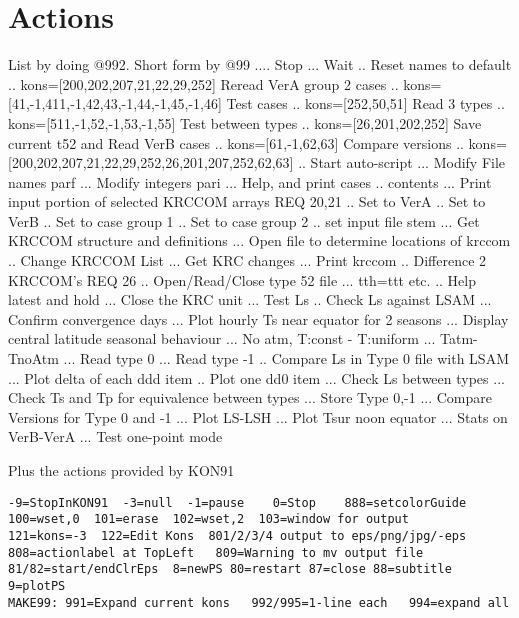 \documentclass{article}  %
\begin{document}
\section{Actions} %
List by doing  @992.  Short form by @99
\qi {}.... Stop
\qi {}...  Wait
\qi {}.. Reset names to default
\qi {}.. kons=[200,202,207,21,22,29,252] Reread VerA group 2 cases
\qi {}.. kons=[41,-1,411,-1,42,43,-1,44,-1,45,-1,46] Test cases
\qi {}.. kons=[252,50,51] Read 3 types 
\qi {}.. kons=[511,-1,52,-1,53,-1,55] Test between types
\qi {}.. kons=[26,201,202,252] Save current t52 and Read VerB cases
\qi {}.. kons=[61,-1,62,63] Compare versions
\qi {}.. kons=[200,202,207,21,22,29,252,26,201,207,252,62,63]
\qi {}.. Start auto-script 
\qi {}... Modify File names parf
\qi {}... Modify integers pari
\qi {}... Help, and print cases
\qi {}.. contents
\qi {}... Print input portion of selected KRCCOM arrays REQ 20,21
\qi {}.. Set to VerA 
\qi {}.. Set to VerB
\qi {}.. Set to case group 1
\qi {}.. Set to case group 2
\qi {}.. set input file stem
\qi {}... Get KRCCOM structure and definitions
\qi {}... Open file to determine locations of krccom
\qi {}.. Change KRCCOM List
\qi {}... Get KRC changes
\qi {}... Print krccom
\qi {}.. Difference 2 KRCCOM's  REQ 26
\qi {}.. Open/Read/Close type 52 file
\qi {}... tth=ttt etc.
\qi {}.. Help latest and hold
\qi {}... Close the KRC unit
\qi {}... Test Ls
\qi {}.. Check Ls against LSAM
\qi {}... Confirm convergence days
\qi {}... Plot hourly Ts near equator for 2 seasons
\qi {}... Display central latitude seasonal behaviour
\qi {}... No atm, T:const - T:uniform
\qi {}... Tatm-TnoAtm
\qi {}... Read type 0
\qi {}... Read type -1
\qi {}.. Compare Ls in Type 0 file with LSAM 
\qi {}... Plot delta  of each ddd item
\qi {}.. Plot one dd0 item
\qi {}... Check Ls between types
\qi {}... Check Ts and Tp for equivalence between types
\qi {}... Store Type 0,-1
\qi {}... Compare Versions for Type 0 and -1
\qi {}... Plot LS-LSH
\qi {}... Plot Tsur noon equator
\qi {}... Stats on VerB-VerA
\qi {}... Test one-point mode

Plus the actions provided by KON91
\vspace{-3.mm} 
\begin{verbatim}
-9=StopInKON91  -3=null  -1=pause    0=Stop    888=setcolorGuide
100=wset,0  101=erase  102=wset,2  103=window for output
121=kons=-3  122=Edit Kons  801/2/3/4 output to eps/png/jpg/-eps
808=actionlabel at TopLeft   809=Warning to mv output file
81/82=start/endClrEps  8=newPS 80=restart 87=close 88=subtitle 9=plotPS
MAKE99: 991=Expand current kons   992/995=1-line each   994=expand all
\end{verbatim}
\end{document}
